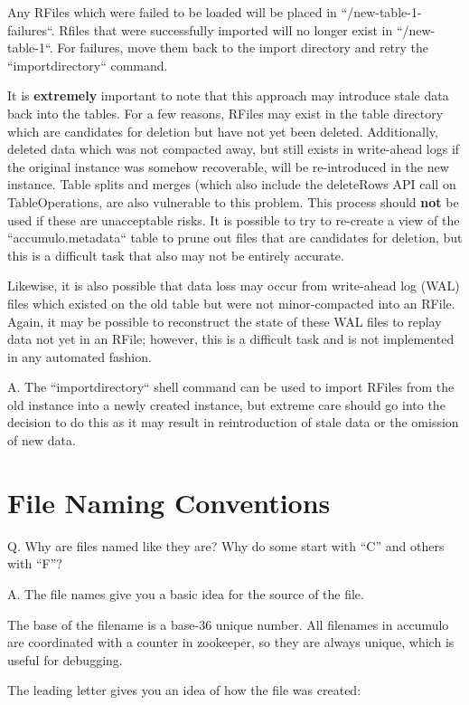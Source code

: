 Any RFiles which were failed to be loaded will be placed in ``/new-table-1-failures``. Rfiles that were successfully
imported will no longer exist in ``/new-table-1``. For failures, move them back to the import directory and retry
the ``importdirectory`` command.

It is \textbf{extremely} important to note that this approach may introduce stale data back into
the tables. For a few reasons, RFiles may exist in the table directory which are candidates for deletion but have
not yet been deleted. Additionally, deleted data which was not compacted away, but still exists in write-ahead logs if
the original instance was somehow recoverable, will be re-introduced in the new instance. Table splits and merges
(which also include the deleteRows API call on TableOperations, are also vulnerable to this problem. This process should
\textbf{not} be used if these are unacceptable risks. It is possible to try to re-create a view of the ``accumulo.metadata``
table to prune out files that are candidates for deletion, but this is a difficult task that also may not be entirely accurate.

Likewise, it is also possible that data loss may occur from write-ahead log (WAL) files which existed on the old table but
were not minor-compacted into an RFile. Again, it may be possible to reconstruct the state of these WAL files to
replay data not yet in an RFile; however, this is a difficult task and is not implemented in any automated fashion.

A. The ``importdirectory`` shell command can be used to import RFiles from the old instance into a newly created instance,
but extreme care should go into the decision to do this as it may result in reintroduction of stale data or the
omission of new data.

\section{File Naming Conventions}

Q. Why are files named like they are? Why do some start with ``C'' and others with ``F''?

A. The file names give you a basic idea for the source of the file.

The base of the filename is a base-36 unique number. All filenames in accumulo are coordinated 
with a counter in zookeeper, so they are always unique, which is useful for debugging.

The leading letter gives you an idea of how the file was created:

